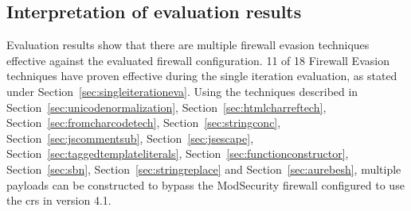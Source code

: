 \subsection{Interpretation of evaluation results}
\label{sec:evalinterpretation}
Evaluation results show that there are multiple firewall evasion techniques effective against the evaluated firewall configuration. 11 of 18 Firewall Evasion techniques have proven effective during the single iteration evaluation, as stated under Section~\ref{sec:singleiterationeva}.
Using the techniques described in Section~\ref{sec:unicodenormalization}, Section~\ref{sec:htmlcharreftech}, Section~\ref{sec:fromcharcodetech}, Section~\ref{sec:stringconc}, Section~\ref{sec:jscommentsub}, Section~\ref{sec:jsescape}, Section~\ref{sec:taggedtemplateliterals}, Section~\ref{sec:functionconstructor}, Section~\ref{sec:sbn}, Section~\ref{sec:stringreplace} and Section~\ref{sec:aurebesh}, multiple payloads can be constructed to bypass the ModSecurity firewall configured to use the \acrshort{crs} in version 4.1.

